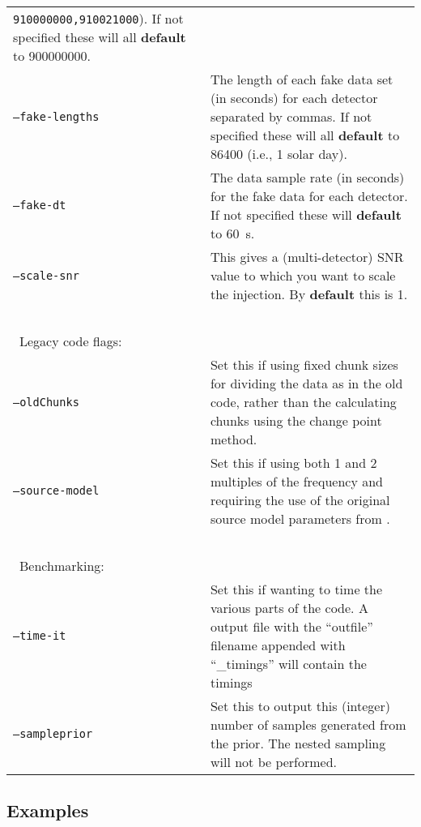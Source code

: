 \begin{footnotesize}
\begin{longtable}{|p{}p{}|}
                            {\tt 910000000,910021000}). If not specified these will all {\bf default} to 900000000. \\
 {\tt --fake-lengths}    &  The length of each fake data set (in seconds) for each detector separated by commas. If not
                            specified these will all {\bf default} to 86400 (i.e., 1 solar day). \\
 {\tt --fake-dt}         &  The data sample rate (in seconds) for the fake data for each detector. If not specified these will
                            {\bf default} to 60~s. \\
 {\tt --scale-snr}       &  This gives a (multi-detector) SNR value to which you want to scale the injection. By {\bf default} this is 1. \\
 ~ & ~ \\
\multicolumn{2}{|l|}{~Legacy code flags:} \\
 {\tt --oldChunks}       &  Set this if using fixed chunk sizes for dividing the data as in the old code, rather than the
                            calculating chunks using the change point method. \\
 {\tt --source-model}    &  Set this if using both 1 and 2 multiples of the frequency and requiring the use of the original source
                            model parameters from \citet{2015MNRAS.453.4399P}. \\
 ~ & ~ \\
\multicolumn{2}{|l|}{~Benchmarking:} \\
 {\tt --time-it}         &  Set this if wanting to time the various parts of the code. A output file with the ``outfile'' filename
                            appended with ``\_timings'' will contain the timings \\
 {\tt --sampleprior}     &  Set this to output this (integer) number of samples generated from the prior. The nested sampling will not
                            be performed. \\
\hline
\end{longtable}
\end{footnotesize}

\subsection{Examples}\label{app:examples}

